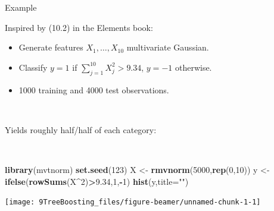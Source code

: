 \documentclass[
  10pt,
  ignorenonframetext,
]{beamer}
\newenvironment{Shaded}{\begin{snugshade}}{\end{snugshade}}
\newcommand{\AttributeTok}[1]{\textcolor[rgb]{0.13,0.29,0.53}{#1}}
\newcommand{\DecValTok}[1]{\textcolor[rgb]{0.00,0.00,0.81}{#1}}
\newcommand{\FloatTok}[1]{\textcolor[rgb]{0.00,0.00,0.81}{#1}}
\newcommand{\FunctionTok}[1]{\textcolor[rgb]{0.13,0.29,0.53}{\textbf{#1}}}
\newcommand{\NormalTok}[1]{#1}
\newcommand{\OtherTok}[1]{\textcolor[rgb]{0.56,0.35,0.01}{#1}}
\newcommand{\SpecialCharTok}[1]{\textcolor[rgb]{0.81,0.36,0.00}{\textbf{#1}}}
\newcommand{\StringTok}[1]{\textcolor[rgb]{0.31,0.60,0.02}{#1}}
\providecommand{\tightlist}{%
  \setlength{\itemsep}{0pt}\setlength{\parskip}{0pt}}
\begin{document}
\begin{frame}[fragile]
\begin{block}{Example}
\label{example}
\(~\)

Inspired by (10.2) in the Elements book:

\vspace{2mm}

\begin{itemize}
\tightlist
\item
  Generate features \(X_1, \ldots, X_{10}\) multivariate Gaussian.
\item
  Classify \(y=1\) if \(\sum_{j=1}^{10}X_j^2 > 9.34\), \(y=-1\)
  otherwise.
\item
  1000 training and 4000 test observations.
\end{itemize}

\(~\)

Yields roughly half/half of each category:

\(~\)

\scriptsize
\centering

\begin{Shaded}
\begin{Highlighting}[]
\FunctionTok{library}\NormalTok{(mvtnorm)}
\FunctionTok{set.seed}\NormalTok{(}\DecValTok{123}\NormalTok{)}
\NormalTok{X }\OtherTok{\textless{}{-}} \FunctionTok{rmvnorm}\NormalTok{(}\DecValTok{5000}\NormalTok{,}\FunctionTok{rep}\NormalTok{(}\DecValTok{0}\NormalTok{,}\DecValTok{10}\NormalTok{))}
\NormalTok{y }\OtherTok{\textless{}{-}} \FunctionTok{ifelse}\NormalTok{(}\FunctionTok{rowSums}\NormalTok{(X}\SpecialCharTok{\^{}}\DecValTok{2}\NormalTok{)}\SpecialCharTok{\textgreater{}}\FloatTok{9.34}\NormalTok{,}\DecValTok{1}\NormalTok{,}\SpecialCharTok{{-}}\DecValTok{1}\NormalTok{)}
\FunctionTok{hist}\NormalTok{(y,}\AttributeTok{title=}\StringTok{""}\NormalTok{)}
\end{Highlighting}
\end{Shaded}

\texttt{[image: 9TreeBoosting\_files/figure-beamer/unnamed-chunk-1-1]}
\end{block}
\end{frame}
\end{document}
